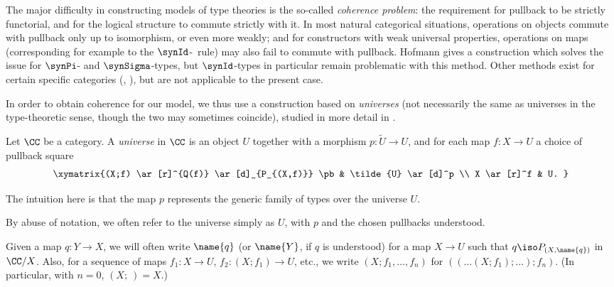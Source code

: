 The major difficulty in constructing models of type theories is the so-called \emph{coherence problem}: the requirement for pullback to be strictly functorial, and for the logical structure to commute strictly with it.  In most natural categorical situations, operations on objects commute with pullback only up to isomorphism, or even more weakly; and for constructors with weak universal properties, operations on maps (corresponding for example to the $\synId$-\elim\ rule) may also fail to commute with pullback.  Hofmann \cite{hofmann:on-the-interpretation} gives a construction which solves the issue for $\synPi$- and $\synSigma$-types, but $\synId$-types in particular remain problematic with this method.  Other methods exist for certain specific categories (\cite{hofmann-streicher}, \cite{warren:thesis}), but are not applicable to the present case.

In order to obtain coherence for our model, we thus use a construction based on \emph{universes} (not necessarily the same as universes in the type-theoretic sense, though the two may sometimes coincide), studied in more detail in \cite{voevodsky:c-systems-from-universes}. 

\begin{definition}
Let $\CC$ be a category.  A \emph{universe} in $\CC$ is an object $U$ together with a morphism $p \colon \tilde{U} \to U$, and for each map $f \colon X \to U$ a choice of pullback square
\[ \xymatrix{(X;f) \ar[r]^{Q(f)}  \ar[d]_{P_{(X,f)}} \pb & \tilde{U} \ar[d]^p \\ X \ar[r]^f & U. } \]
\end{definition} 

The intuition here is that the map $p$ represents the generic family of types over the universe $U$.  
 
By abuse of notation, we often refer to the universe simply as $U$, with $p$ and the chosen pullbacks understood.  

Given a map $q \colon Y \to X$, we will often write $\name{q}$ (or $\name{Y}$, if $q$ is understood) for a map $X \to U$ such that $q \iso P_{(X,\name{q})}$ in $\CC/X$.  Also, for a sequence of maps $f_1 \colon X \to U$, $f_2 \colon (X;f_1) \to U$, etc., we write $(X;f_1,\ldots, f_n)$ for $((\ldots(X;f_1);\ldots); f_n)$.  (In particular, with $n=0$, $(X;\ ) = X$.)

